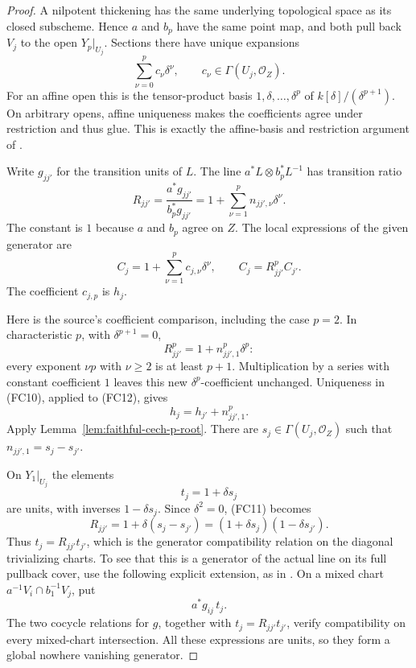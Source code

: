 \begin{proof}
A nilpotent thickening has the same underlying topological
space as its closed subscheme.
Hence \(a\) and \(b_p\) have the same point map, and both
pull back \(V_j\) to the open \(Y_p|_{U_j}\).
Sections there have unique expansions
\[
                     \sum_{\nu=0}^{p}c_\nu\delta^\nu,
                \qquad c_\nu\in\Gamma(U_j,\mathcal O_Z).
 \tag{FC10}\label{eq:faithful-thick-expansion}
\]
For an affine open this is the tensor-product basis
\(1,\delta,\ldots,\delta^p\) of
\(k[\delta]/(\delta^{p+1})\).
On arbitrary opens, affine uniqueness makes the
coefficients agree under restriction and thus glue.
This is exactly the affine-basis and restriction argument
of .

Write \(g_{jj'}\) for the transition units of \(L\).
The line \(a^*L\otimes b_p^*L^{-1}\) has transition ratio
\[
 R_{jj'}=\frac{a^*g_{jj'}}{b_p^*g_{jj'}}
        =1+\sum_{\nu=1}^p n_{jj',\nu}\delta^\nu.
 \tag{FC11}\label{eq:faithful-thick-transition}
\]
The constant is \(1\) because \(a\) and \(b_p\) agree on \(Z\).
The local expressions of the given generator are
\[
                C_j=1+\sum_{\nu=1}^p c_{j,\nu}\delta^\nu,
                 \qquad C_j=R_{jj'}^p C_{j'} .
 \tag{FC12}\label{eq:faithful-generator-overlap}
\]
The coefficient \(c_{j,p}\) is \(h_j\).

Here is the source's coefficient comparison, including
the case \(p=2\).
In characteristic \(p\), with \(\delta^{p+1}=0\),
\[
 R_{jj'}^p=1+n_{jj',1}^p\delta^p:
\]
every exponent \(\nu p\) with \(\nu\ge2\) is at least \(p+1\).
Multiplication by a series with constant coefficient \(1\)
leaves this new \(\delta^p\)-coefficient unchanged.
Uniqueness in (FC10), applied to (FC12), gives
\[
                            h_j=h_{j'}+n_{jj',1}^p.
 \tag{FC13}\label{eq:faithful-thick-top-coefficient}
\]
Apply Lemma~\ref{lem:faithful-cech-p-root}.
There are \(s_j\in\Gamma(U_j,\mathcal O_Z)\) such that
\(n_{jj',1}=s_j-s_{j'}\).

On \(Y_1|_{U_j}\) the elements
\[
                         t_j=1+\delta s_j
\]
are units, with inverses \(1-\delta s_j\).
Since \(\delta^2=0\), (FC11) becomes
\[
  R_{jj'}=1+\delta(s_j-s_{j'})
                 =(1+\delta s_j)(1-\delta s_{j'}).
\]
Thus \(t_j=R_{jj'}t_{j'}\), which is the generator
compatibility relation on the diagonal trivializing charts.
To see that this is a generator of the actual line
on its full pullback cover, use the following explicit
extension, as in .
On a mixed chart \(a^{-1}V_i\cap b_1^{-1}V_j\), put
\[
                         a^*g_{ij}\,t_j.
\]
The two cocycle relations for \(g\), together with
\(t_j=R_{jj'}t_{j'}\), verify compatibility on every
mixed-chart intersection.
All these expressions are units, so they form a global
nowhere vanishing generator.
\end{proof}

